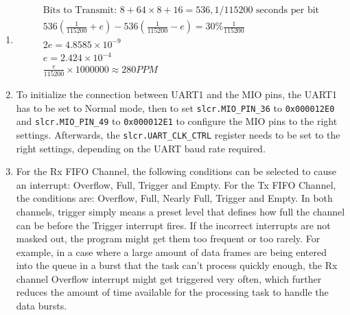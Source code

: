 \documentclass{article}
\begin{document}
\begin{enumerate}
      \item \begin{equation}\begin{gathered}
                        \text{Bits to Transmit: }8+64\times8+16=536, 1/115200 \text{ seconds per bit}\\
                        536 \left(\frac{1}{115200} + e\right) - 536\left(\frac{1}{115200} - e\right) = 30\% \frac{1}{115200}\\
                        2e = 4.8585\times 10^{-9}\\
                        e = 2.424\times 10 ^{-4}\\
                        \frac{e}{115200} \times 1000000 \approx 280 PPM
                  \end{gathered}\end{equation}

      \item To initialize the connection between UART1 and the MIO pins, the UART1 has to be set to Normal mode, then to set \verb|slcr.MIO_PIN_36| to \verb|0x000012E0| and \verb|slcr.MIO_PIN_49| to \verb|0x000012E1| to configure the MIO pins to the right settings. Afterwards, the \verb|slcr.UART_CLK_CTRL| register needs to be set to the right settings, depending on the UART baud rate required.

      \item For the Rx FIFO Channel, the following conditions can be selected to cause an interrupt: Overflow, Full, Trigger and Empty. For the Tx FIFO Channel, the conditions are: Overflow, Full, Nearly Full, Trigger and Empty. In both channels, trigger simply means a preset level that defines how full the channel can be before the Trigger interrupt fires. If the incorrect interrupts are not masked out, the program might get them too frequent or too rarely. For example, in a case where a large amount of data frames are being entered into the queue in a burst that the task can't process quickly enough, the Rx channel Overflow interrupt might get triggered very often, which further reduces the amount of time available for the processing task to handle the data bursts.

\end{enumerate}
\end{document}

